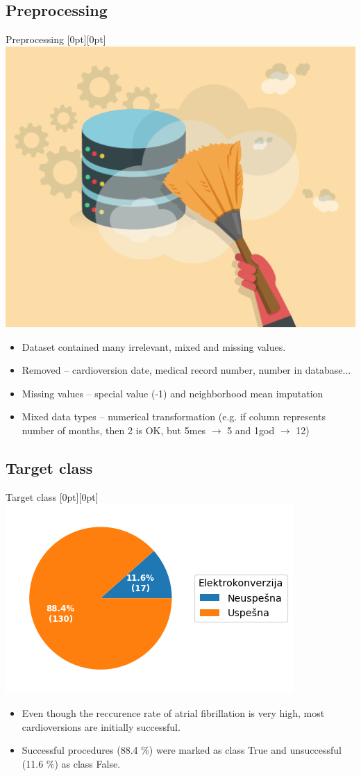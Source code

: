 \documentclass[hyperref={bookmarks=false}]{beamer}
\newcommand{\lenitem}[2][.51\linewidth]{\parbox[t]{#1}{\strut #2\strut}}
\begin{document}
\subsection{Preprocessing}
\begin{frame}{Preprocessing}
\mbox{}\hfill\raisebox{-\height}[0pt][0pt]{\includegraphics[width=.42\linewidth]{prep.png}}
\vspace*{-\baselineskip}

\begin{itemize}
    \item \lenitem{Dataset contained many irrelevant, mixed and missing values.}

    \item \lenitem{Removed -- cardioversion date, medical record number, number in database...}

    \item \lenitem{Missing values -- special value (-1) and neighborhood mean imputation}

    \item \lenitem{Mixed data types -- numerical transformation (e.g. if column represents number of months, then 2 is OK, but 5mes $\rightarrow$ 5 and 1god $\rightarrow$ 12)}
\end{itemize}
\end{frame}

\subsection{Target class}
\begin{frame}{Target class}
\mbox{}\hfill\raisebox{-\height}[0pt][0pt]{\includegraphics[width=.42\linewidth]{target.png}}
\vspace*{-\baselineskip}

\begin{itemize}
    \item \lenitem{Even though the reccurence rate of atrial fibrillation is very high, most cardioversions are initially successful.}

    \item \lenitem{Successful procedures (88.4 \%) were marked as class True and unsuccessful (11.6 \%) as class False.}
\end{itemize}
\end{frame}
\end{document}
